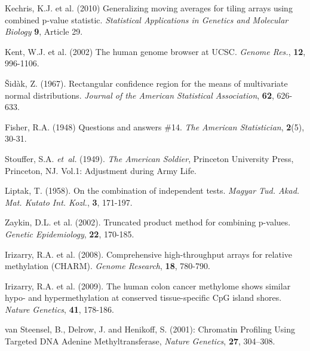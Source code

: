 \documentclass{bioinfo}
\begin{document}
\begin{thebibliography}{}
Kechris, K.J. et al. (2010)
Generalizing moving averages for tiling arrays using combined p-value
statistic. {\it Statistical Applications in Genetics and Molecular Biology}
{\bf 9}, Article 29.

 Kent, W.J. et al. (2002) The human genome browser at UCSC. {\it Genome Res.}, {\bf 12}, 996-1106.

Šidàk, Z. (1967).
Rectangular conﬁdence region for the means of multivariate normal distributions.
\textit{Journal of the American Statistical Association}, {\bf 62}, 626-633.

Fisher, R.A. (1948)
Questions and answers \#14.
{\it The American Statistician}, {\bf 2}(5), 30-31.

Stouffer, S.A. \textit{et~al.} (1949). \textit{The American Soldier},
Princeton University Press, Princeton, NJ. Vol.1: Adjustment during Army Life.

Liptak, T. (1958). On the combination of independent tests. {\it Magyar Tud.
Akad. Mat. Kutato Int. Kozl.}, {\bf 3}, 171-197.

 Zaykin, D.L. et al. (2002).
Truncated product method for combining p-values. {\it Genetic Epidemiology},
{\bf 22}, 170-185.

 Irizarry, R.A. et al.
(2008). Comprehensive high-throughput arrays for relative methylation (CHARM).
{\it Genome Research}, {\bf 18}, 780-790.

 Irizarry, R.A. et al.
(2009). The human colon cancer methylome shows similar hypo- and
hypermethylation at conserved tissue-specific CpG island shores.
{\it Nature Genetics}, {\bf 41}, 178-186.

van Steensel, B., Delrow, J. and Henikoff, S. (2001): Chromatin Profiling Using Targeted DNA Adenine Methyltransferase,
{\it Nature Genetics}, {\bf 27}, 304–308.

\end{thebibliography}
\end{document}
